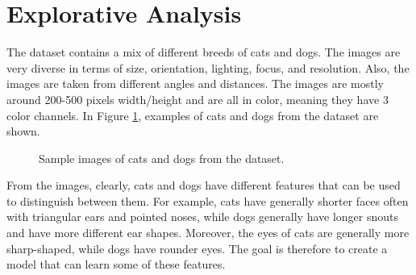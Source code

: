 \section{Explorative Analysis}
The dataset contains a mix of different breeds of cats and dogs.
The images are very diverse in terms of size, orientation, lighting, focus, and resolution.
Also, the images are taken from different angles and distances.
The images are mostly around 200-500 pixels width/height and are all in color, meaning they have 3 color channels.
In Figure \ref{fig:cats_dogs}, examples of cats and dogs from the dataset are shown.
\begin{figure}[H]
    \vspace*{-0.7cm}
    \centering
    \hspace{0.4cm}
    \caption{Sample images of cats and dogs from the dataset.}
    \label{fig:cats_dogs}
    \vspace*{-0.7cm}
\end{figure}

From the images, clearly, cats and dogs have different features that can be used to distinguish between them.
For example, cats have generally shorter faces often with triangular ears and pointed noses,
while dogs generally have longer snouts and have more different ear shapes.
Moreover, the eyes of cats are generally more sharp-shaped, while dogs have rounder eyes. The goal is therefore to create a model that can learn some of these features.